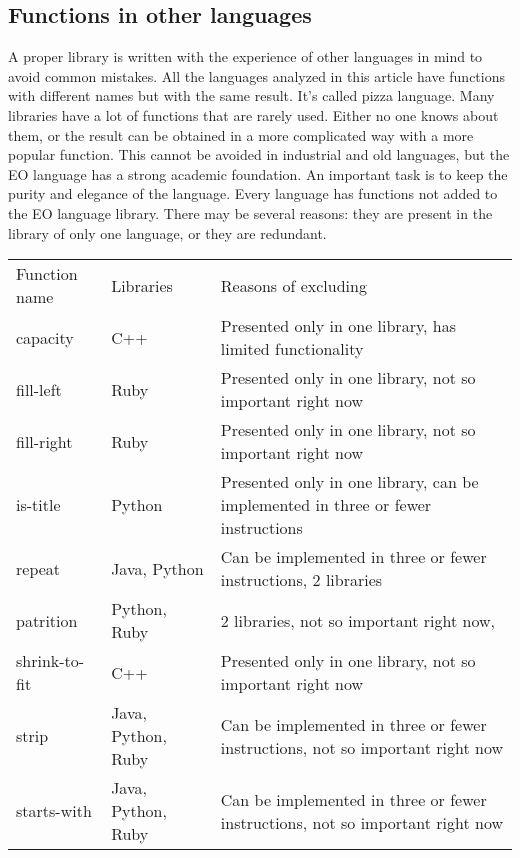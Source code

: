 \documentclass[11pt,nonacm,natbib=false]{acmart}
\begin{document}
\subsection{Functions in other languages}
A proper library is written with the experience of other languages in mind to avoid common mistakes. All the languages analyzed in this article have functions with different names but with the same result. It's called pizza language. Many libraries have a lot of functions that are rarely used. Either no one knows about them, or the result can be obtained in a more complicated way with a more popular function. This cannot be avoided in industrial and old languages, but the EO language has a strong academic foundation. An important task is to keep the purity and elegance of the language. 
Every language has functions not added to the EO language library. There may be several reasons: they are present in the library of only one language, or they are redundant. 
\begin{table}[]
\begin{tabular}{ l | l | p{265pt}}
Function name & Libraries          & Reasons of excluding                                                             \\
capacity      & C++                & Presented only in one library, has limited functionality                         \\
fill-left    & Ruby               & Presented only in one library, not so important right now                        \\
fill-right    & Ruby               & Presented only in one library, not so important right now                        \\
is-title      & Python             & Presented only in one library, can be implemented in three or fewer instructions \\
repeat        & Java, Python       & Can be implemented in three or fewer instructions, 2 libraries                   \\
patrition     & Python, Ruby       & 2 libraries, not so important right now,                                         \\
shrink-to-fit & C++                & Presented only in one library, not so important right now                        \\
strip         & Java, Python, Ruby & Can be implemented in three or fewer instructions, not so important right now    \\
starts-with   & Java, Python, Ruby & Can be implemented in three or fewer instructions, not so important right now   
\end{tabular}
\end{table}
\end{document}
